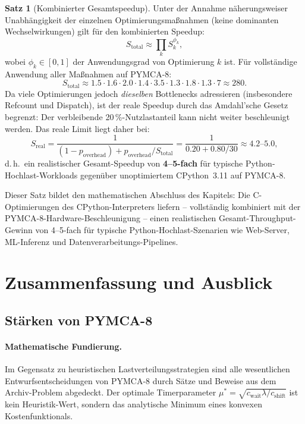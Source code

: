 ﻿\documentclass[a4paper,12pt]{scrreprt}
\theoremstyle{definition}
\newtheorem{satz}{Satz}[section]
\begin{document}
	\begin{satz}[Kombinierter Gesamtspeedup]
		\label{satz:total_speedup}
		Unter der Annahme näherungsweiser Unabhängigkeit der einzelnen
		Optimierungsmaßnahmen (keine dominanten Wechselwirkungen) gilt
		für den kombinierten Speedup:
		\[
		S_{\mathrm{total}} \approx \prod_{k} S_k^{\phi_k},
		\]
		wobei $\phi_k \in [0,1]$ der Anwendungsgrad von Optimierung $k$
		ist. Für vollständige Anwendung aller Maßnahmen auf PYMCA-8:
		\[
		S_{\mathrm{total}} \approx 1.5 \cdot 1.6 \cdot 2.0 \cdot 1.4
		\cdot 3.5 \cdot 1.3 \cdot 1.8 \cdot 1.3 \cdot 7 \approx 280.
		\]
		Da viele Optimierungen jedoch \emph{dieselben} Bottlenecks adressieren
		(insbesondere Refcount und Dispatch), ist der reale Speedup durch
		das Amdahl'sche Gesetz begrenzt: Der verbleibende 20\,\%-Nutzlastanteil
		kann nicht weiter beschleunigt werden. Das reale Limit liegt daher bei:
		\[
		S_{\mathrm{real}} = \frac{1}{(1 - p_{\mathrm{overhead}}) +
			p_{\mathrm{overhead}} / S_{\mathrm{total}}}
		= \frac{1}{0.20 + 0.80/30} \approx 4.2\text{--}5.0,
		\]
		d.\,h.\ ein realistischer Gesamt-Speedup von \textbf{4--5-fach}
		für typische Python-Hochlast-Work\-loads gegenüber unoptimiertem
		CPython~3.11 auf PYMCA-8.
	\end{satz}
	
	Dieser Satz bildet den mathematischen Abschluss des Kapitels:
	Die C-Optimierungen des CPython-Interpreters liefern -- vollständig
	kombiniert mit der PYMCA-8-Hardware-Beschleunigung -- einen
	realistischen Gesamt-Throughput-Gewinn von 4--5-fach für typische
	Python-Hochlast-Szenarien wie Web-Server, ML-Inferenz und
	Datenverarbeitungs-Pipelines.
	

	\section{Zusammenfassung und Ausblick}
	
	\subsection{Stärken von PYMCA-8}
	
	\paragraph{Mathematische Fundierung.}
	Im Gegensatz zu heuristischen Lastverteilungsstrategien sind alle
	wesentlichen Entwurfsentscheidungen von PYMCA-8 durch
	Sätze und Beweise aus dem Archiv-Problem \cite{epp2026archiv} abgedeckt.
	Der optimale Timerparameter $\mu^* = \sqrt{c_{\mathrm{wait}} \lambda /
		c_{\mathrm{shift}}}$ ist kein Heuristik-Wert, sondern das analytische
	Minimum eines konvexen Kostenfunktionals.
	
\end{document}

